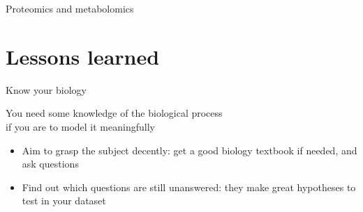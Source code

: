 \begin{frame}{Proteomics and metabolomics}
\end{frame}

\section{Lessons learned}

\begin{frame}[t]{Know your biology}
    \begin{center}
        You need some \alert{knowledge of the biological process}\\
        if you are to model it meaningfully
    \end{center}
    \vfill
    \begin{itemize}
        \item Aim to grasp the subject decently: get a good biology textbook if
              needed, and ask questions
        \item Find out which questions are still unanswered: they make great
              hypotheses to test in your dataset
    \end{itemize}
\end{frame}

